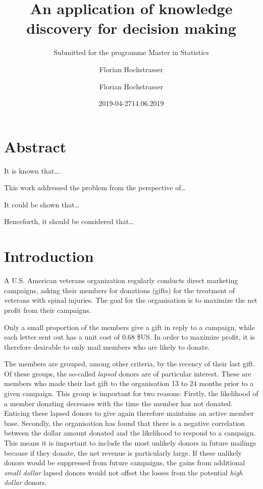\documentclass[
  11pt,
  a4paper,
  DIV=12,captions=tableheading,oneside]{scrbook}
\author{Florian Hochstrasser}
\date{2019-04-27}
\begin{document}
\begin{titlepage}

\titlehead{Master Thesis}
\subject{Profit maximisation for direct marketing campaigns}
\title{An application of knowledge discovery for decision making}
\subtitle{Submitted for the programme Master in Statistics}
\author{Florian Hochstrasser}
\date{14.06.2019}
\publishers{Supervisor: Jacques Zuber}
\extratitle{ }
\uppertitleback{Obiger Titelrückentitel}
\lowertitleback{Für dieses Beispiel wird keine Haftung übernommen.}
\dedication{Dieses Beispiel widme ich\\allen LaTeX Usern}

\end{titlepage}

{
\setcounter{tocdepth}{2}
\tableofcontents
}
\hypertarget{abstract}{%
\chapter*{Abstract}\label{abstract}}

It is known that\ldots{}.

This work addressed the problem from the perspective of\ldots{}

It could be shown that\ldots{}

Henceforth, it should be considered that\ldots{}

\hypertarget{intro}{%
\chapter{Introduction}\label{intro}}

A U.S. American veterans organization regularly conducts direct marketing campaigns, asking their members for donations (gifts) for the treatment of veterans with spinal injuries. The goal for the organisation is to maximize the net profit from their campaigns.

Only a small proportion of the members give a gift in reply to a campaign, while each letter sent out has a unit cost of 0.68 \$US. In order to maximize profit, it is therefore desirable to only mail members who are likely to donate.

The members are grouped, among other criteria, by the recency of their last gift. Of these groups, the so-called \emph{lapsed} donors are of particular interest. These are members who made their last gift to the organisation 13 to 24 months prior to a given campaign.
This group is important for two reasons: Firstly, the likelihood of a member donating decreases with the time the member has not donated. Enticing these lapsed donors to give again therefore maintains an active member base. Secondly, the organisation has found that there is a negative correlation between the dollar amount donated and the likelihood to respond to a campaign. This means it is important to include the most unlikely donors in future mailings because if they donate, the net revenue is particularly large. If these unlikely donors would be suppressed from future campaigns, the gains from additional \emph{small dollar} lapsed donors would not offset the losses from the potential \emph{high dollar} donors.
\end{document}

